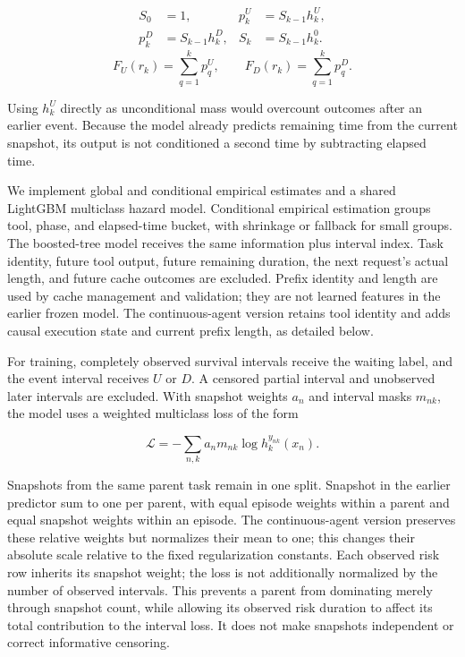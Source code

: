 \documentclass[sigconf, screen, review, balance=false]{acmart}
\begin{document}
\[
\begin{aligned}
S_0&=1,& p_k^U&=S_{k-1}h_k^U,\\
p_k^D&=S_{k-1}h_k^D,& S_k&=S_{k-1}h_k^0.
\end{aligned}
\] \[
F_U(r_k)=\sum_{q=1}^{k}p_q^U,\qquad
F_D(r_k)=\sum_{q=1}^{k}p_q^D.
\]

Using \(h_k^U\) directly as unconditional mass would overcount outcomes
after an earlier event. Because the model already predicts remaining
time from the current snapshot, its output is not conditioned a second
time by subtracting elapsed time.

We implement global and conditional empirical estimates and a shared
LightGBM multiclass hazard model. Conditional empirical estimation
groups tool, phase, and elapsed-time bucket, with shrinkage or fallback
for small groups. The boosted-tree model receives the same information
plus interval index. Task identity, future tool output, future remaining
duration, the next request's actual length, and future cache outcomes
are excluded. Prefix identity and length are used by cache management
and validation; they are not learned features in the earlier frozen
model. The continuous-agent version retains tool identity and adds
causal execution state and current prefix length, as detailed below.

For training, completely observed survival intervals receive the waiting
label, and the event interval receives \(U\) or \(D\). A censored
partial interval and unobserved later intervals are excluded. With
snapshot weights \(a_n\) and interval masks \(m_{nk}\), the model uses a
weighted multiclass loss of the form

\[
\mathcal L=-\sum_{n,k}a_n m_{nk}\log h_k^{y_{nk}}(x_n).
\]

Snapshots from the same parent task remain in one split. Snapshot
in the earlier predictor sum to one per parent, with equal episode
weights within a parent and equal snapshot weights within an episode.
The continuous-agent version preserves these relative weights but
normalizes their mean to one; this changes their absolute scale relative
to the fixed regularization constants. Each observed risk
row inherits its snapshot weight; the loss is not additionally
normalized by the number of observed intervals. This prevents a parent
from dominating merely through snapshot count, while allowing its
observed risk duration to affect its total contribution to the interval
loss. It does not make snapshots independent or correct informative
censoring.
\end{document}

